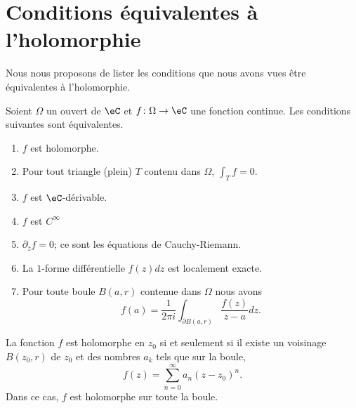 \section{Conditions équivalentes à l'holomorphie}

Nous nous proposons de lister les conditions que nous avons vues être équivalentes à l'holomorphie.

\begin{theorem}         \label{THOooOGOCooUalFaG}
	Soient \( \Omega\) un ouvert de \( \eC\) et \( f\colon \Omega\to \eC\) une fonction continue. Les conditions suivantes sont équivalentes.
	\begin{enumerate}
		\item   \label{ItemOtPcTb}
		      \( f\) est holomorphe.
		\item   \label{ItemHWRnxx}
		      Pour tout triangle (plein) \( T\) contenu dans \( \Omega\), \( \int_Tf=0\).
		\item   \label{ItempBBPVv}
		      \( f\) est \( \eC\)-dérivable.
		\item   \label{ItemmLhzbB}
		      \( f\) est \(  C^{\infty}\)
		\item   \label{ItemCCrSrLj}
		      \( \partial_{\bar z}f  =0\); ce sont les équations de Cauchy-Riemann.
		\item   \label{ItemEvxRSn}
		      La \( 1\)-forme différentielle \( f(z)dz\) est localement exacte.
		\item   \label{ItemVSCHtY}
		      Pour toute boule \( B(a,r)\) contenue dans \( \Omega\) nous avons
		      \begin{equation}
			      f(a)=\frac{1}{ 2\pi i }\int_{\partial B(a,r)}\frac{ f(z) }{ z-a }dz.
		      \end{equation}
	\end{enumerate}

	La fonction \( f\) est holomorphe en \( z_0\) si et seulement si il existe un voisinage \( B(z_0,r)\) de \( z_0\) et des nombres \( a_k\) tels que sur la boule,
	\begin{equation}
		f(z)=\sum_{n=0}^{\infty}a_n(z-z_0)^n.
	\end{equation}
	Dans ce cas, \( f\) est holomorphe sur toute la boule.
\end{theorem}

